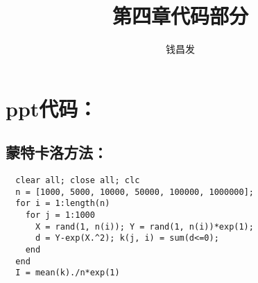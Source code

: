 \documentclass[oneside]{ctexart}
\begin{document}
\title{第四章代码部分}
\author{钱昌发}
\maketitle
\section{ppt代码：}
\subsection{蒙特卡洛方法：}
\begin{lstlisting}
  clear all; close all; clc
  n = [1000, 5000, 10000, 50000, 100000, 1000000];
  for i = 1:length(n)
    for j = 1:1000
      X = rand(1, n(i)); Y = rand(1, n(i))*exp(1);
      d = Y-exp(X.^2); k(j, i) = sum(d<=0);
    end
  end
  I = mean(k)./n*exp(1)
\end{lstlisting}
\end{document}
